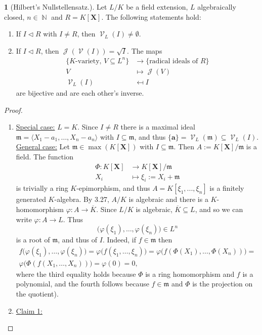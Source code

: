 \documentclass[12pt,a4paper]{report}
\theoremstyle{definition}
\theoremstyle{num.custom-title}
\newtheorem{teo_custom-title}[theorem]{} %
\newenvironment{claim}[1]{\par\noindent\underline{Claim#1:}\space}{} %
\DeclareMathOperator{\J}{\mathcal{J}}
\DeclareMathOperator{\N}{\mathbb{N}}
\DeclareMathOperator{\V}{\mathcal{V}}
\DeclareMathOperator{\sse}{\subseteq}
\newcommand{\ol}{\overline}
\newcommand{\m}{\mathfrak{m}}
\newcommand{\X}{\mathbf{X}}
\renewcommand{\phi}{\varphi}
\begin{document}
\begin{teo_custom-title}[Hilbert's Nullstellensatz.]
Let $L/K$ be a field extension, $L$ algebraically closed, $n \in \N$ and $R = K[\X]$. The following statements hold:
\begin{enumerate}
\item If $I \lhd R$ with $I \neq R$, then $\V_L(I) \neq \emptyset$.
\item If $I \lhd R$, then $\J(\V(I)) = \sqrt{I}$. The maps
\begin{align*}
\{ K\text{-variety, } V \sse L^n \} & \to \{ \text{radical ideals of } R \} \\
V & \mapsto \J(V) \\
\V_L(I) & \mapsfrom I
\end{align*}
are bijective and are each other's inverse.
\end{enumerate}
\begin{proof}\ 
\begin{enumerate}
\item \underline{Special case:} $L=K$. Since $I \neq R$ there is a maximal ideal $\m = \langle X_1-a_1, \ldots, X_n-a_n \rangle$ with $I \sse \m$, and thus $\{\mathbf{a}\} = \V_L(\m) \sse \V_L(I)$.\\
\underline{General case:} Let $\m \in \max(K[\X])$ with $I \sse \m$. Then $A := K[\X]/\m$ is a field. The function 
\begin{align*}
\Phi: K[\X] & \to K[\X]/\m \\
X_i & \mapsto \xi_i := X_i + \m
\end{align*}
is trivially a ring $K$-epimorphism, and thus $A=K[\xi_1,...,\xi_n]$ is a finitely generated $K$-algebra. By 3.27, $A/K$ is algebraic and there is a $K$-homomorphism $\phi: A \to \ol{K}$. Since $L/K$ is algebraic, $\ol{K} \sse L$, and so we can write $\phi : A \to L$. Thus
\[
\Big( \phi(\xi_1), \ldots, \phi(\xi_n) \Big) \in L^n
\]
is a root of $\m$, and thus of $I$. Indeed, if $f \in \m$ then 
\begin{multline*}
f \Big( \phi(\xi_1), \ldots, \phi(\xi_n) \Big) = \phi \Big(f(\xi_1, \ldots, \xi_n) \Big) = \phi \Big(f(\Phi(X_1), \ldots, \Phi(X_n)) \Big) = \\
\phi \Big( \Phi( f(X_1, \ldots, X_n)) \Big) = \phi(0) = 0,
\end{multline*}
where the third equality holds because $\Phi$ is a ring homomorphism and $f$ is a polynomial, and the fourth follows because $f \in \m$ and $\Phi$ is the projection on the quotient).
\item 
\begin{claim}{ 1}

\end{claim}
\end{enumerate}
\end{proof}
\end{teo_custom-title}
\end{document}

